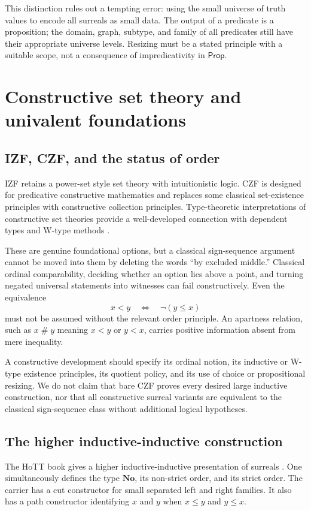 \documentclass[11pt,letterpaper]{article}
\numberwithin{equation}{section}
\theoremstyle{definition}
\theoremstyle{remark}
\newcommand{\No}{\mathbf{No}}
\newcommand{\Prop}{\mathsf{Prop}}
\begin{document}
This distinction rules out a tempting error: using the small universe of truth values to encode all surreals as small data. The output of a predicate is a proposition; the domain, graph, subtype, and family of all predicates still have their appropriate universe levels. Resizing must be a stated principle with a suitable scope, not a consequence of impredicativity in $\Prop$.

\section{Constructive set theory and univalent foundations}\label{sec:constructive}
\subsection{IZF, CZF, and the status of order}
IZF retains a power-set style set theory with intuitionistic logic. CZF is designed for predicative constructive mathematics and replaces some classical set-existence principles with constructive collection principles. Type-theoretic interpretations of constructive set theories provide a well-developed connection with dependent types and W-type methods \cite{GambinoAczel}.

These are genuine foundational options, but a classical sign-sequence argument cannot be moved into them by deleting the words ``by excluded middle.'' Classical ordinal comparability, deciding whether an option lies above a point, and turning negated universal statements into witnesses can fail constructively. Even the equivalence
\[
 x<y\quad\Longleftrightarrow\quad\neg(y\le x)
\]
must not be assumed without the relevant order principle. An apartness relation, such as $x\mathrel{\#}y$ meaning $x<y$ or $y<x$, carries positive information absent from mere inequality.

A constructive development should specify its ordinal notion, its inductive or W-type existence principles, its quotient policy, and its use of choice or propositional resizing. We do not claim that bare CZF proves every desired large inductive construction, nor that all constructive surreal variants are equivalent to the classical sign-sequence class without additional logical hypotheses.

\subsection{The higher inductive-inductive construction}
The HoTT book gives a higher inductive-inductive presentation of surreals \cite[\S11.6]{HoTT}. One simultaneously defines the type $\No$, its non-strict order, and its strict order. The carrier has a cut constructor for small separated left and right families. It also has a path constructor identifying $x$ and $y$ when $x\le y$ and $y\le x$.
\end{document}
